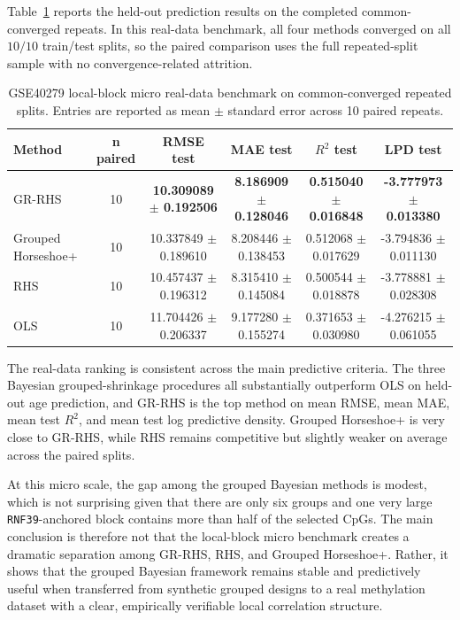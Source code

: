 \documentclass[11pt]{article}
\begin{document}
Table~\ref{tab:gse40279-realdata} reports the held-out prediction results on
the completed common-converged repeats. In this real-data benchmark, all four
methods converged on all \(10/10\) train/test splits, so the paired comparison
uses the full repeated-split sample with no convergence-related attrition.

\begin{table}[H]
\centering
\caption{GSE40279 local-block micro real-data benchmark on common-converged repeated splits. Entries are reported as mean \(\pm\) standard error across 10 paired repeats.}
\label{tab:gse40279-realdata}
\begin{tabular}{lccccc}
\toprule
Method & n paired & RMSE test & MAE test & \(R^2\) test & LPD test \\
\midrule
GR-RHS & 10 & \textbf{10.309089 $\pm$ 0.192506} & \textbf{8.186909 $\pm$ 0.128046} & \textbf{0.515040 $\pm$ 0.016848} & \textbf{-3.777973 $\pm$ 0.013380} \\
Grouped Horseshoe+ & 10 & 10.337849 $\pm$ 0.189610 & 8.208446 $\pm$ 0.138453 & 0.512068 $\pm$ 0.017629 & -3.794836 $\pm$ 0.011130 \\
RHS & 10 & 10.457437 $\pm$ 0.196312 & 8.315410 $\pm$ 0.145084 & 0.500544 $\pm$ 0.018878 & -3.778881 $\pm$ 0.028308 \\
OLS & 10 & 11.704426 $\pm$ 0.206337 & 9.177280 $\pm$ 0.155274 & 0.371653 $\pm$ 0.030980 & -4.276215 $\pm$ 0.061055 \\
\bottomrule
\end{tabular}
\end{table}

The real-data ranking is consistent across the main predictive criteria. The
three Bayesian grouped-shrinkage procedures all substantially outperform OLS on
held-out age prediction, and GR-RHS is the top method on mean RMSE, mean MAE,
mean test \(R^2\), and mean test log predictive density. Grouped Horseshoe+ is
very close to GR-RHS, while RHS remains competitive but slightly weaker on
average across the paired splits.

At this micro scale, the gap among the grouped Bayesian methods is modest,
which is not surprising given that there are only six groups and one very large
\texttt{RNF39}-anchored block contains more than half of the selected CpGs.
The main conclusion is therefore not that the local-block micro benchmark
creates a dramatic separation among GR-RHS, RHS, and Grouped Horseshoe+.
Rather, it shows that the grouped Bayesian framework remains stable and
predictively useful when transferred from synthetic grouped designs to a real
methylation dataset with a clear, empirically verifiable local correlation
structure.
\end{document}
